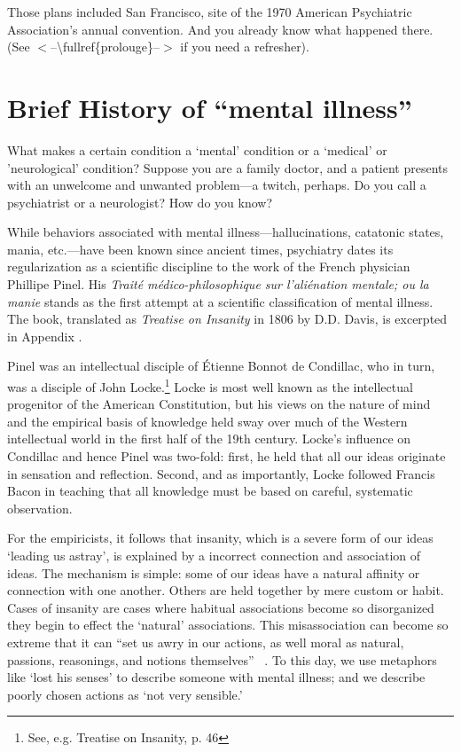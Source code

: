 \begin{refsection}
Those plans included San Francisco, site of the 1970 American Psychiatric Association’s annual convention. And you already know what happened there. (See $<$--\textbackslash{}fullref\{prolouge\}--$>$ if you need a refresher).

\section{Brief History of “mental illness”}
\label{briefhistoryof“mentalillness”}

What makes a certain condition a ‘mental’ condition or a `medical' or ’neurological’ condition? Suppose you are a family doctor, and a patient presents with an unwelcome and unwanted problem---a twitch, perhaps. Do you call a psychiatrist or a neurologist? How do you know?

While behaviors associated with mental illness---hallucinations, catatonic states, mania, etc.---have been known since ancient times, psychiatry dates its regularization as a scientific discipline to the work of the French physician Phillipe Pinel. His \emph{Traité médico-philosophique sur l'aliénation mentale; ou la manie} stands as the first attempt at a scientific classification of mental illness. The book, translated as \emph{Treatise on Insanity} in 1806 by D.D. Davis, is excerpted in Appendix . 

Pinel was an intellectual disciple of Étienne Bonnot de Condillac, who in turn, was a disciple of John Locke.\footnote{See, e.g. Treatise on Insanity, p. 46} Locke is most well known as the intellectual progenitor of the American Constitution, but his views on the nature of mind and the empirical basis of knowledge held sway over much of the Western intellectual world in the first half of the 19th century. Locke's influence on Condillac and hence Pinel was two-fold: first, he held that all our ideas originate in sensation and reflection. Second, and as importantly, Locke followed Francis Bacon in teaching that all knowledge must be based on careful, systematic observation.

For the empiricists, it follows that insanity, which is a severe form of our ideas `leading us astray', is explained by a incorrect connection and association of ideas. The mechanism is simple: some of our ideas have a natural affinity or connection with one another. Others are held together by mere custom or habit. Cases of insanity are cases where habitual associations become so disorganized they begin to effect the `natural' associations. This misassociation can become so extreme that it can “set us awry in our actions, as well moral as natural, passions, reasonings, and notions themselves” ~\citep[Bk 2, Ch 33, p9. Pg. 531]{Locke:1959wj}. To this day, we use metaphors like `lost his senses' to describe someone with mental illness; and we describe poorly chosen actions as `not very sensible.'


\end{refsection}

